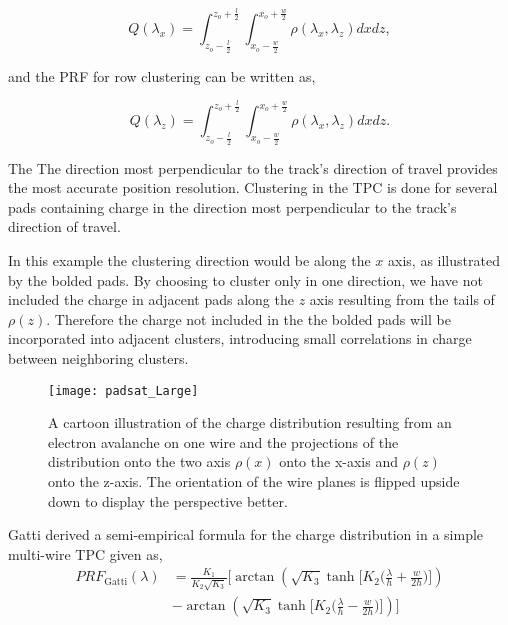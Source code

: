 \begin{equation}
Q(\lambda_x) = \int_{z_o - \frac{l}{2}}^{z_o + \frac{l}{2}} \int_{x_o - \frac{w}{2}}^{x_o + \frac{w}{2}} \rho(\lambda_x,\lambda_z) dxdz,
\label{eq:prflayer}
\end{equation}

and the PRF for row clustering can be written as, 

\begin{equation}
Q(\lambda_z) = \int_{z_o - \frac{l}{2}}^{z_o + \frac{l}{2}} \int_{x_o - \frac{w}{2}}^{x_o + \frac{w}{2}} \rho(\lambda_x,\lambda_z) dxdz.
\label{eq:prfrow}
\end{equation}

The The direction most perpendicular to the track's direction of travel provides the most accurate position resolution.  Clustering in the \spirit TPC is done for several pads containing charge in the direction most perpendicular to the track's direction of travel. 

In this example the clustering direction would be along the $x$ axis, as illustrated by the bolded pads. By choosing to cluster only in one direction, we have not included the charge in adjacent pads along the $z$ axis resulting from the tails of $\rho(z)$. Therefore the charge not included in the the bolded pads will be incorporated into adjacent clusters, introducing small correlations in charge between neighboring clusters. 

\begin{figure}[!htb]
\texttt{[image: padsat\_Large]}
\caption{A cartoon illustration of the charge distribution resulting from an electron avalanche on one wire and the projections of the distribution onto the two axis $\rho(x)$ onto the x-axis and $\rho(z)$ onto the z-axis. The orientation of the wire planes is flipped upside down to display the perspective better.}
\label{fig:2DPRF}
\end{figure}

Gatti \cite{gatti} derived a semi-empirical formula for the charge distribution in a simple multi-wire TPC given as, 
\begin{equation}\label{eq:gatti}
\begin{split}
PRF_{\mathrm{Gatti}}(\lambda)
& = \frac{K_{1}}{K_{2}\sqrt{K_{3}}}\bigl[\arctan(\sqrt{K_{3}}\tanh\bigl[K_{2}\bigl(\frac{\lambda}{h}+\frac{w}{2h}\bigr)\bigr]) \\
& - \arctan(\sqrt{K_{3}}\tanh\bigl[K_{2}\bigl(\frac{\lambda}{h}-\frac{w}{2h}\bigr)\bigr])\bigr] \\
\end{split}
\end{equation}

